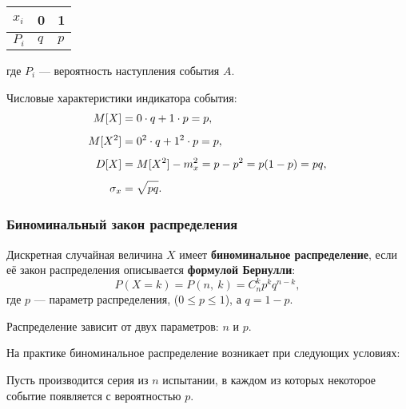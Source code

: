 \documentclass[a4paper]{article}
\newcommand{\sleq}{\leqslant}
\newcommand{\sqrtt}[1]{\sqrt{\vphantom{qb} #1}}
\newcommand{\key}[1]{{\color{Medium}\bfseries #1}}
\begin{document}
                \begin{tabular}{*{3}{|C{2.6cm}}|}
                    \hline
                    $x_i$ & 0 & 1  \\
                    \hline
                    $P_i$ & $q$ & $p$  \\
                    \hline
                \end{tabular}

                где $P_i$ --- вероятность наступления события $A$.

                Числовые характеристики индикатора события:
                \begin{equation*}
                    \begin{aligned}
                        M[X] & = 0 \cdot q + 1 \cdot p = p , \\[1.0ex]
                        M[X^2] & = 0^2 \cdot q + 1^2 \cdot p = p , \\[1.0ex]
                        D[X] & = M[X^2] - m_x^2 = p - p^2 = p (1 - p) = p q , \\[1.0ex]
                        \sigma_x & = \sqrtt{p q} .
                    \end{aligned}
                \end{equation*}

            \subsubsection{Биноминальный закон распределения}

                Дискретная случайная величина $X$ имеет \key{биноминальное распределение}, если её закон распределения описывается \key{формулой Бернулли}:
                \begin{equation*}
                    P(X = k) = P(n, \: k) = C_n^k p^k q^{n - k} ,
                \end{equation*}
                где $p$ --- параметр распределения, ($0 \sleq p \sleq 1$), а $q = 1 - p$.

                Распределение зависит от двух параметров: $n$ и $p$.

                На практике биноминальное распределение возникает при следующих условиях:
                
                Пусть производится серия из $n$ испытании, в каждом из которых некоторое событие появляется с вероятностью $p$.
                
\end{document}
